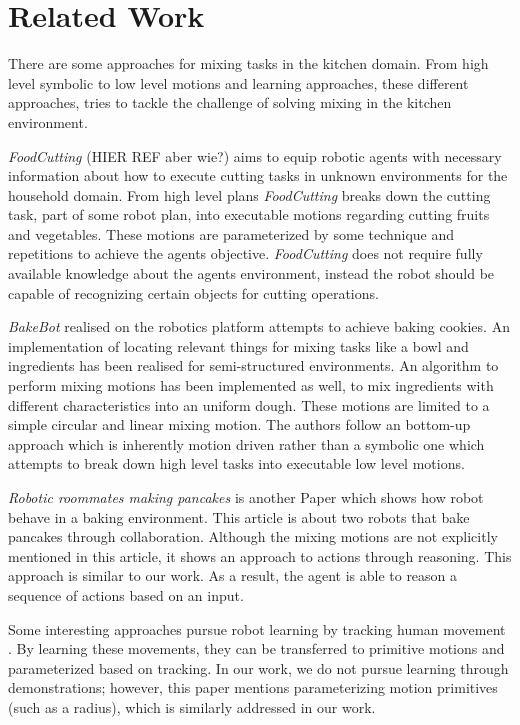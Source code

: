 \chapter{Related Work}
\label{chap:Related_work}
There are some approaches for mixing tasks in the kitchen domain. From high level symbolic to low level motions and 
learning approaches, these different approaches, tries to tackle the challenge of solving mixing in the kitchen environment.

\textit{FoodCutting} (HIER REF aber wie?) aims to equip robotic agents with necessary information about how to 
execute  cutting tasks in unknown environments for the household domain. From high level plans \textit{FoodCutting} breaks down 
the cutting task, part of some robot plan, into executable motions regarding cutting fruits and vegetables. These motions are parameterized 
by some technique and repetitions to achieve the agents objective. 
\textit{FoodCutting} does not require fully available knowledge
about the agents environment, instead the robot should be capable of recognizing certain objects for cutting 
operations. 


\textit{BakeBot} \cite{Bollini2011BakebotBC} realised on the \textit{}  robotics platform attempts to achieve baking cookies. An implementation of locating relevant things for mixing tasks
like a bowl and ingredients has been realised for semi-structured environments. An algorithm to perform mixing motions has been implemented as well, to mix 
ingredients with different characteristics into an uniform dough. These motions are limited to a simple circular and linear mixing motion.
The authors follow an bottom-up approach which is inherently motion driven rather than a
symbolic one which attempts to break down high level tasks into executable low level motions. 

\textit{Robotic roommates making pancakes} \cite{beetzrrmp} is another Paper which shows how robot behave in a baking environment. This article is about two robots that bake pancakes through collaboration. 
Although the mixing motions are not explicitly mentioned in this article, it shows an approach to actions through reasoning. This approach is similar to our work. As a result, the agent is able to reason a sequence of actions based on an input.

Some interesting approaches pursue robot learning by tracking human movement \cite{10.1007/978-3-030-95892-3_22}. By learning these movements, they can be transferred to primitive motions and parameterized based on tracking.
In our work, we do not pursue learning through demonstrations; however, this paper mentions parameterizing motion primitives (such as a radius), which is similarly addressed in our work.
 
